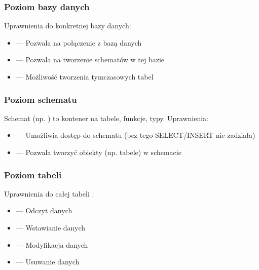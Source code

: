 \documentclass[letterpaper,10pt,polish]{sphinxmanual}
\begin{document}
\subsubsection{Poziom bazy danych}
\label{\detokenize{rozdzial2/bezpieczenstwo/index:poziom-bazy-danych}}
\sphinxAtStartPar
Uprawnienia do konkretnej bazy danych:
\begin{itemize}
\item {} 
\sphinxAtStartPar
{} — Pozwala na połączenie z bazą danych

\item {} 
\sphinxAtStartPar
{} — Pozwala na tworzenie schematów w tej bazie

\item {} 
\sphinxAtStartPar
{} — Możliwość tworzenia tymczasowych tabel

\end{itemize}


\subsubsection{Poziom schematu}
\label{\detokenize{rozdzial2/bezpieczenstwo/index:poziom-schematu}}
\sphinxAtStartPar
Schemat (np. ) to kontener na tabele, funkcje, typy. Uprawnienia:
\begin{itemize}
\item {} 
\sphinxAtStartPar
{} — Umożliwia dostęp do schematu (bez tego SELECT/INSERT nie zadziała)

\item {} 
\sphinxAtStartPar
{} — Pozwala tworzyć obiekty (np. tabele) w schemacie

\end{itemize}


\subsubsection{Poziom tabeli}
\label{\detokenize{rozdzial2/bezpieczenstwo/index:poziom-tabeli}}
\sphinxAtStartPar
Uprawnienia do całej tabeli :
\begin{itemize}
\item {} 
\sphinxAtStartPar
{} — Odczyt danych

\item {} 
\sphinxAtStartPar
{} — Wstawianie danych

\item {} 
\sphinxAtStartPar
{} — Modyfikacja danych

\item {} 
\sphinxAtStartPar
{} — Usuwanie danych

\end{itemize}
\end{document}
